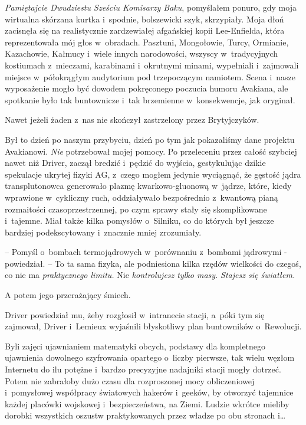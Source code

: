 \documentclass[oneside,polish,12pt,sfheadings]{mwbk}
\begin{document}
\emph{Pamiętajcie Dwudziestu Sześciu Komisarzy Baku}, pomyślałem ponuro,
gdy moja wirtualna skórzana kurtka i~spodnie, bolszewicki szyk,
skrzypiały. Moja dłoń zacisnęła się na realistycznie zardzewiałej
afgańskiej kopii Lee-Enfielda, która reprezentowała mój głos w~obradach.
Pasztuni, Mongołowie, Turcy, Ormianie, Kazachowie, Kałmucy i~wiele
innych narodowości, wszyscy w~tradycyjnych kostiumach z~mieczami,
karabinami i~okrutnymi minami, wypełniali i~zajmowali miejsce w~półokrągłym audytorium pod trzepoczącym namiotem. Scena i~nasze
wyposażenie mogło być dowodem pokręconego poczucia humoru Avakiana, ale
spotkanie było tak buntownicze i~tak brzemienne w~konsekwencje, jak
oryginał.

Nawet jeżeli żaden z~nas nie skończył zastrzelony przez Brytyjczyków.

Był to dzień po naszym przybyciu, dzień po tym jak pokazaliśmy dane
projektu Avakianowi. \emph{Nie} potrzebował mojej pomocy. Po przeleceniu
przez całość szybciej nawet niż Driver, zaczął bredzić i~pędzić do
wyjścia, gestykulując dzikie spekulacje ukrytej fizyki AG, z~czego
mogłem jedynie wyciągnąć, że gęstość jądra transplutonowca generowało
plazmę kwarkowo-gluonową w~jądrze, które, kiedy wprawione w~cykliczny
ruch, oddziaływało bezpośrednio z~kwantową pianą rozmaitości
czasoprzestrzennej, po czym sprawy stały się skomplikowane i~tajemne.
Miał także kilka pomysłów o~Silniku, co do których był jeszcze bardziej
podekscytowany i~znacznie mniej zrozumiały.

-- Pomyśl o~bombach termojądrowych w~porównaniu z~bombami jądrowymi -
powiedział. -- To ta sama fizyka, ale podniesiona kilka rzędów wielkości
do czegoś, co nie ma \emph{praktycznego limitu. } Nie \emph{kontrolujesz
tylko masy. } \emph{Stajesz się światłem.}

A potem jego przerażający śmiech.

Driver powiedział mu, żeby rozgłosił w~intranecie stacji, a~póki tym się
zajmował, Driver i~Lemieux wyjaśnili błyskotliwy plan buntowników o~Rewolucji.

Byli zajęci ujawnianiem matematyki obcych, podstawy dla kompletnego
ujawnienia dowolnego szyfrowania opartego o~liczby pierwsze, tak wielu
węzłom Internetu do ilu potężne i~bardzo precyzyjne nadajniki stacji
mogły dotrzeć. Potem nie zabrałoby dużo czasu dla rozproszonej mocy
obliczeniowej i~pomysłowej współpracy światowych hakerów i~geeków, by
otworzyć tajemnice każdej placówki wojskowej i~bezpieczeństwa, na Ziemi.
Ludzie wkrótce mieliby dorobki wszystkich oszustw praktykowanych przez
władze po obu stronach i\ldots
\end{document}
